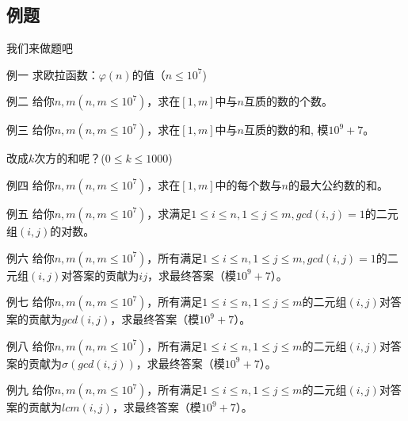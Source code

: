 \documentclass[9pt]{beamer}
\begin{document}
			\subsection{例题}
			\begin{frame}{我们来做题吧}
				\begin{block}{例一}
					求欧拉函数：$\varphi(n)$的值（$n \leq 10^7$)
				\end{block}
			\end{frame}
			\begin{frame}
				\begin{block}{例二}
					给你$n,m(n,m \leq 10^7)$，求在$[1,m]$中与$n$互质的数的个数。
				\end{block}
			\end{frame}
			\begin{frame}
				\begin{block}{例三}
					给你$n,m(n,m \leq 10^7)$，求在$[1,m]$中与$n$互质的数的和, 模$10^9 + 7$。
				\end{block}
				\pause 
				改成$k$次方的和呢？($0 \leq k \leq 1000$)
			\end{frame}
			\begin{frame}
				\begin{block}{例四}
					给你$n,m(n,m \leq 10^7)$，求在$[1,m]$中的每个数与$n$的最大公约数的和。
				\end{block}
			\end{frame}
			\begin{frame}
				\begin{block}{例五}
					给你$n,m(n,m \leq 10^7)$，求满足$1 \leq i \leq n, 1 \leq j \leq m, gcd(i,j) = 1$的二元组$(i,j)$的对数。
				\end{block}
			\end{frame}
			\begin{frame}
				\begin{block}{例六}
					给你$n,m(n,m \leq 10^7)$，所有满足$1 \leq i \leq n, 1 \leq j \leq m, gcd(i,j) = 1$的二元组$(i,j)$对答案的贡献为$ij$，求最终答案（模$10^9+7$）。
				\end{block}
			\end{frame}
			\begin{frame}
				\begin{block}{例七}
					给你$n,m(n,m \leq 10^7)$，所有满足$1 \leq i \leq n, 1 \leq j \leq m$的二元组$(i,j)$对答案的贡献为$gcd(i,j)$，求最终答案（模$10^9+7$）。
				\end{block}
			\end{frame}
			\begin{frame}
				\begin{block}{例八}
					给你$n,m(n,m \leq 10^7)$，所有满足$1 \leq i \leq n, 1 \leq j \leq m$的二元组$(i,j)$对答案的贡献为$\sigma(gcd(i,j))$，求最终答案（模$10^9+7$）。
				\end{block}
			\end{frame}
			\begin{frame}
				\begin{block}{例九}
					给你$n,m(n,m \leq 10^7)$，所有满足$1 \leq i \leq n, 1 \leq j \leq m$的二元组$(i,j)$对答案的贡献为$lcm(i,j)$，求最终答案（模$10^9+7$）。
				\end{block}
			\end{frame}
\end{document}
